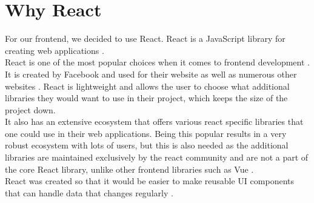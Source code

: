 \section{Why React}
For our frontend, we decided to use React.
React is a JavaScript library for creating web applications \cite{ReactJS}. 
\\
React is one of the most popular choices when it comes to frontend development \cite{NPMVueReactAngular}.
It is created by Facebook and used for their website as well as numerous other websites \cite{ReactHistory}.
React is lightweight and allows the user to choose what additional libraries they would want to use in their project, which keeps the size of the project down.
\\
It also has an extensive ecosystem that offers various react specific libraries that one could use in their web applications.
Being this popular results in a very robust ecosystem with lots of users, but this is also needed as the additional libraries are maintained exclusively by the react community and are not a part of the core React library, unlike other frontend libraries such as Vue \cite{Vue}.
\\
React was created so that it would be easier to make reusable UI components that can handle data that changes regularly \cite{ReactHistory}.
